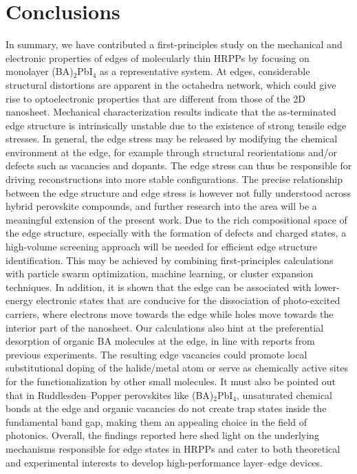 \documentclass[aps,prl,preprint,11pt,superscriptaddress,bibnotes,amsmath,amssymb,amsfonts,showkeys]{revtex4-2}
\begin{document}
\section{Conclusions}
In summary, we have contributed a first-principles study on the mechanical and electronic properties of edges of molecularly thin HRPPs by focusing on monolayer (BA)$_2$PbI$_4$ as a representative system. At edges, considerable structural distortions are apparent in the octahedra network, which could give rise to optoelectronic properties that are different from those of the 2D nanosheet. Mechanical characterization results indicate that the as-terminated edge structure is intrinsically unstable due to the existence of strong tensile edge stresses. In general, the edge stress may be released by modifying the chemical environment at the edge, for example through structural reorientations and/or defects such as vacancies and dopants. The edge stress can thus be responsible for driving reconstructions into more stable configurations. The precise relationship between the edge structure and edge stress is however not fully understood across hybrid perovskite compounds, and further research into the area will be a meaningful extension of the present work. Due to the rich compositional space of the edge structure, especially with the formation of defects and charged states, a high-volume screening approach will be needed for  efficient edge structure identification. This may be achieved by combining first-principles calculations with particle swarm optimization, machine learning, or cluster expansion techniques. In addition, it is shown that the edge can be associated with lower-energy electronic states that are conducive for the dissociation of photo-excited carriers, where electrons move towards the edge while holes move towards the interior part of the nanosheet. Our calculations also hint at the preferential desorption of organic BA molecules at the edge, in line with reports from previous experiments. The resulting edge vacancies could promote local substitutional doping of the halide/metal atom or serve as chemically active sites for the functionalization by other small molecules. It must also be pointed out that in Ruddlesden--Popper perovskites like (BA)$_2$PbI$_4$, unsaturated chemical bonds at the edge and organic vacancies do not create trap states inside the fundamental band gap, making them an appealing choice in the field of photonics. Overall, the findings reported here shed light on the underlying mechanisms responsible for edge states in HRPPs and cater to both theoretical and experimental interests to develop high-performance layer--edge devices.
\end{document}
